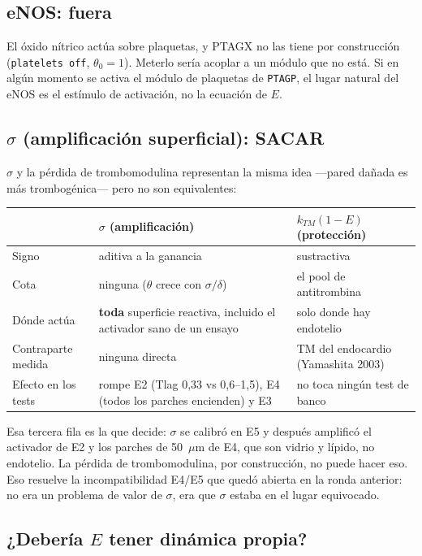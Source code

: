 \documentclass[11pt,a4paper]{article}
\newcommand{\SACA}{\textcolor{out}{\textbf{SACAR}}}
\begin{document}
\subsection{eNOS: fuera}

El óxido nítrico actúa sobre plaquetas, y PTAGX no las tiene por construcción
(\verb|platelets off|, $\theta_0=1$). Meterlo sería acoplar a un módulo que no
está. Si en algún momento se activa el módulo de plaquetas de \texttt{PTAGP}, el
lugar natural del eNOS es el estímulo de activación, no la ecuación de $E$.

\subsection{$\sigma$ (amplificación superficial): \SACA}

$\sigma$ y la pérdida de trombomodulina representan la misma idea ---pared dañada
es más trombogénica--- pero no son equivalentes:

\begin{center}
\small
\begin{tabular}{@{}p{3.2cm}p{5.4cm}p{5.4cm}@{}}
\toprule
 & $\sigma$ (amplificación) & $k_{TM}(1-E)$ (protección) \\
\midrule
Signo & aditiva a la ganancia & sustractiva \\
Cota & ninguna ($\theta$ crece con $\sigma/\delta$) & el pool de antitrombina \\
Dónde actúa & \textbf{toda} superficie reactiva, incluido el activador sano de un ensayo & solo donde hay endotelio \\
Contraparte medida & ninguna directa & TM del endocardio (Yamashita 2003) \\
Efecto en los tests & rompe E2 (Tlag 0{,}33 vs 0{,}6--1{,}5), E4 (todos los parches encienden) y E3 & no toca ningún test de banco \\
\bottomrule
\end{tabular}
\end{center}

\noindent
Esa tercera fila es la que decide: $\sigma$ se calibró en E5 y después amplificó el
activador de E2 y los parches de 50~$\mu$m de E4, que son vidrio y lípido, no
endotelio. La pérdida de trombomodulina, por construcción, no puede hacer eso. Eso
resuelve la incompatibilidad E4/E5 que quedó abierta en la ronda anterior: no era
un problema de valor de $\sigma$, era que $\sigma$ estaba en el lugar equivocado.

\subsection{¿Debería $E$ tener dinámica propia?}
\end{document}
